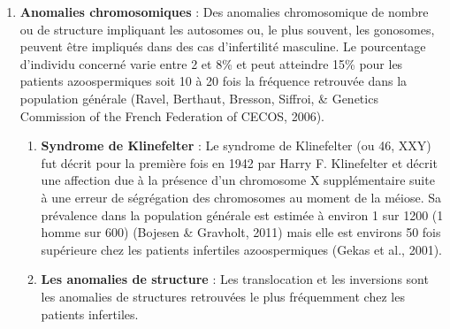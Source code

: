\documentclass[12pt,twoside]{reedthesis}
\providecommand{\tightlist}{%
  \setlength{\itemsep}{0pt}\setlength{\parskip}{0pt}}
\theoremstyle{definition}
\theoremstyle{definition}
\theoremstyle{remark}
\begin{document}
  \begin{enumerate}
  \def\labelenumi{\arabic{enumi}.}
  \setcounter{enumi}{1}
  \tightlist
  \item
    \textbf{Anomalies chromosomiques} : Des anomalies chromosomique de
    nombre ou de structure impliquant les autosomes ou, le plus souvent,
    les gonosomes, peuvent être impliqués dans des cas d'infertilité
    masculine. Le pourcentage d'individu concerné varie entre 2 et 8\% et
    peut atteindre 15\% pour les patients azoospermiques soit 10 à 20 fois
    la fréquence retrouvée dans la population générale (Ravel, Berthaut,
    Bresson, Siffroi, \& Genetics Commission of the French Federation of
    CECOS, 2006).
  
    \begin{enumerate}
    \def\labelenumii{\alph{enumii}.}
    \tightlist
    \item
      \textbf{Syndrome de Klinefelter} : Le syndrome de Klinefelter (ou
      46, XXY) fut décrit pour la première fois en 1942 par Harry F.
      Klinefelter et décrit une affection due à la présence d'un
      chromosome X supplémentaire suite à une erreur de ségrégation des
      chromosomes au moment de la méiose. Sa prévalence dans la population
      générale est estimée à environ 1 sur 1200 (1 homme sur 600) (Bojesen
      \& Gravholt, 2011) mais elle est environs 50 fois supérieure chez
      les patients infertiles azoospermiques (Gekas et al., 2001).\\
    \item
      \textbf{Les anomalies de structure} : Les translocation et les
      inversions sont les anomalies de structures retrouvées le plus
      fréquemment chez les patients infertiles.
  

\end{enumerate}
\end{enumerate}
\end{document}
